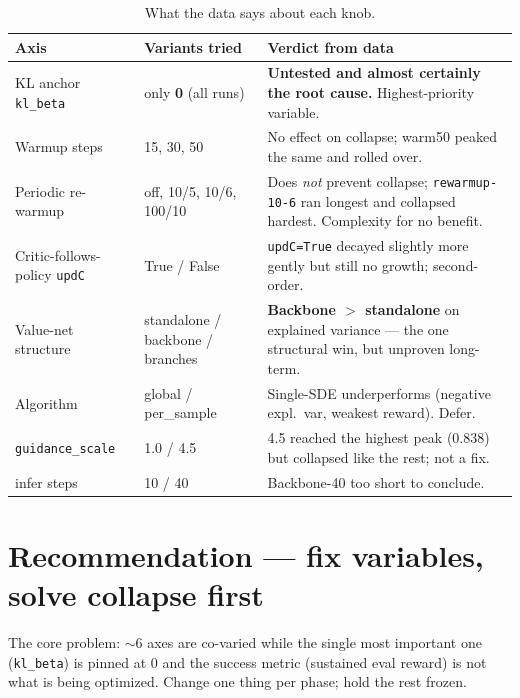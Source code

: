 \documentclass[11pt]{article}
\newcommand{\code}[1]{\texttt{#1}}
\begin{document}
\begin{table}[h]
\centering
\caption{What the data says about each knob.}
\label{tab:peraxis}
\small
\begin{tabular}{p{3.0cm} p{3.6cm} p{7.0cm}}
\toprule
\textbf{Axis} & \textbf{Variants tried} & \textbf{Verdict from data} \\
\midrule
KL anchor \code{kl\_beta} & only \textbf{0} (all runs) & \textbf{Untested and almost certainly the root cause.} Highest-priority variable. \\
Warmup steps & 15, 30, 50 & No effect on collapse; warm50 peaked the same and rolled over. \\
Periodic re-warmup & off, 10/5, 10/6, 100/10 & Does \emph{not} prevent collapse; \code{rewarmup-10-6} ran longest and collapsed hardest. Complexity for no benefit. \\
Critic-follows-policy \code{updC} & True / False & \code{updC=True} decayed slightly more gently but still no growth; second-order. \\
Value-net structure & standalone / backbone / branches & \textbf{Backbone $>$ standalone} on explained variance --- the one structural win, but unproven long-term. \\
Algorithm & global / per\_sample & Single-SDE underperforms (negative expl.\ var, weakest reward). Defer. \\
\code{guidance\_scale} & 1.0 / 4.5 & 4.5 reached the highest peak (0.838) but collapsed like the rest; not a fix. \\
infer steps & 10 / 40 & Backbone-40 too short to conclude. \\
\bottomrule
\end{tabular}
\end{table}

\section{Recommendation --- fix variables, solve collapse first}
\label{sec:reco}

The core problem: ${\sim}6$ axes are co-varied while the single most important one
(\code{kl\_beta}) is pinned at $0$ and the success metric (sustained eval reward) is not
what is being optimized. Change one thing per phase; hold the rest frozen.
\end{document}
